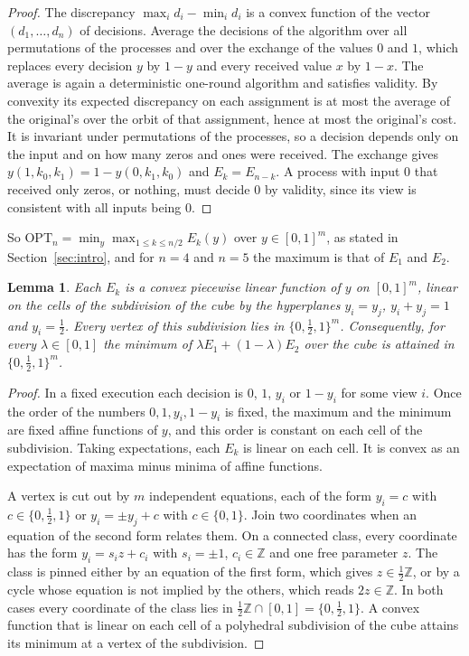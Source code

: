 \documentclass[11pt]{article}
\newtheorem{lemma}[theorem]{Lemma}
\newcommand{\OPT}{\mathrm{OPT}}
\newcommand{\h}{\tfrac12}
\begin{document}
\begin{proof}
The discrepancy $\max_id_i-\min_id_i$ is a convex function of the vector $(d_1,\dots,d_n)$ of decisions. Average the decisions of the algorithm over all permutations of the processes and over the exchange of the values $0$ and $1$, which replaces every decision $y$ by $1-y$ and every received value $x$ by $1-x$. The average is again a deterministic one-round algorithm and satisfies validity. By convexity its expected discrepancy on each assignment is at most the average of the original's over the orbit of that assignment, hence at most the original's cost. It is invariant under permutations of the processes, so a decision depends only on the input and on how many zeros and ones were received. The exchange gives $y(1,k_0,k_1)=1-y(0,k_1,k_0)$ and $E_k=E_{n-k}$. A process with input $0$ that received only zeros, or nothing, must decide $0$ by validity, since its view is consistent with all inputs being $0$.
\end{proof}

So $\OPT_n=\min_y\max_{1\le k\le n/2}E_k(y)$ over $y\in[0,1]^m$, as stated in Section~\ref{sec:intro}, and for $n=4$ and $n=5$ the maximum is that of $E_1$ and $E_2$.

\begin{lemma}\label{lem:vert}
Each $E_k$ is a convex piecewise linear function of $y$ on $[0,1]^m$, linear on the cells of the subdivision of the cube by the hyperplanes $y_i=y_j$, $y_i+y_j=1$ and $y_i=\h$. Every vertex of this subdivision lies in $\{0,\h,1\}^m$. Consequently, for every $\lambda\in[0,1]$ the minimum of $\lambda E_1+(1-\lambda)E_2$ over the cube is attained in $\{0,\h,1\}^m$.
\end{lemma}

\begin{proof}
In a fixed execution each decision is $0$, $1$, $y_i$ or $1-y_i$ for some view $i$. Once the order of the numbers $0,1,y_i,1-y_i$ is fixed, the maximum and the minimum are fixed affine functions of $y$, and this order is constant on each cell of the subdivision. Taking expectations, each $E_k$ is linear on each cell. It is convex as an expectation of maxima minus minima of affine functions.

A vertex is cut out by $m$ independent equations, each of the form $y_i=c$ with $c\in\{0,\h,1\}$ or $y_i=\pm y_j+c$ with $c\in\{0,1\}$. Join two coordinates when an equation of the second form relates them. On a connected class, every coordinate has the form $y_i=s_iz+c_i$ with $s_i=\pm1$, $c_i\in\mathbb{Z}$ and one free parameter $z$. The class is pinned either by an equation of the first form, which gives $z\in\h\mathbb{Z}$, or by a cycle whose equation is not implied by the others, which reads $2z\in\mathbb{Z}$. In both cases every coordinate of the class lies in $\h\mathbb{Z}\cap[0,1]=\{0,\h,1\}$. A convex function that is linear on each cell of a polyhedral subdivision of the cube attains its minimum at a vertex of the subdivision.
\end{proof}
\end{document}
